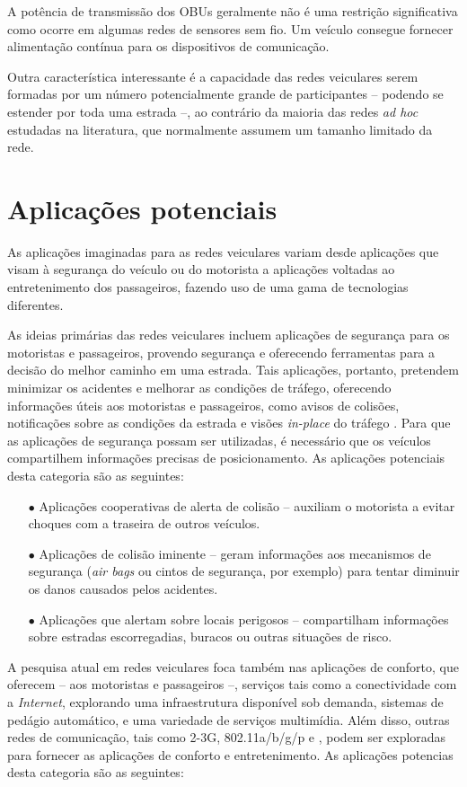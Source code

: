 A potência de transmissão dos OBUs geralmente não é uma restrição significativa
como ocorre em algumas redes de sensores sem fio. Um veículo consegue fornecer
alimentação contínua para os dispositivos de comunicação.

Outra característica interessante é a capacidade das redes veiculares
serem formadas por um número potencialmente grande de participantes --
podendo se estender por toda uma estrada --, ao contrário da maioria
das redes \textit{ad hoc} estudadas na literatura, que normalmente assumem um
tamanho limitado da rede.

\section{Aplicações potenciais}
As aplicações imaginadas para as redes veiculares variam desde aplicações que
visam à segurança do veículo ou do motorista a aplicações voltadas ao
entretenimento dos passageiros, fazendo uso de uma gama de tecnologias
diferentes.

As ideias primárias das redes veiculares incluem aplicações de segurança para
os motoristas e passageiros, provendo segurança e oferecendo ferramentas para a
decisão do melhor caminho em uma estrada. Tais aplicações, portanto, pretendem
minimizar os acidentes e melhorar as condições de tráfego, oferecendo informações
úteis aos motoristas e passageiros, como avisos de colisões, notificações
sobre as condições da estrada e visões \textit{in-place} do tráfego
\cite{moustafa2009vehicular}. Para que as aplicações de segurança possam ser
utilizadas, é necessário que os veículos compartilhem informações precisas de
posicionamento. As aplicações potenciais desta categoria são as seguintes:

\begin{enumerate}
 \item[$\bullet$] Aplicações cooperativas de alerta de colisão -- auxiliam o
 motorista a evitar choques com a traseira de outros veículos.
 \item[$\bullet$] Aplicações de colisão iminente -- geram informações aos
 mecanismos de segurança (\textit{air bags} ou cintos de segurança, por exemplo)
 para tentar diminuir os danos causados pelos acidentes.
 \item[$\bullet$] Aplicações que alertam sobre locais perigosos -- compartilham
 informações sobre estradas escorregadias, buracos ou outras situações de risco.
\end{enumerate}

A pesquisa atual em redes veiculares foca também nas aplicações de conforto,
que oferecem -- aos motoristas e passageiros --, serviços tais como a
conectividade com a \textit{Internet}, explorando uma infraestrutura disponível
sob demanda, sistemas de pedágio automático, e uma variedade de serviços
multimídia. Além disso, outras redes de comunicação, tais como 2-3G,
802.11a/b/g/p e , podem ser exploradas para fornecer as aplicações de conforto e
entretenimento. As aplicações potencias desta categoria são as seguintes:


